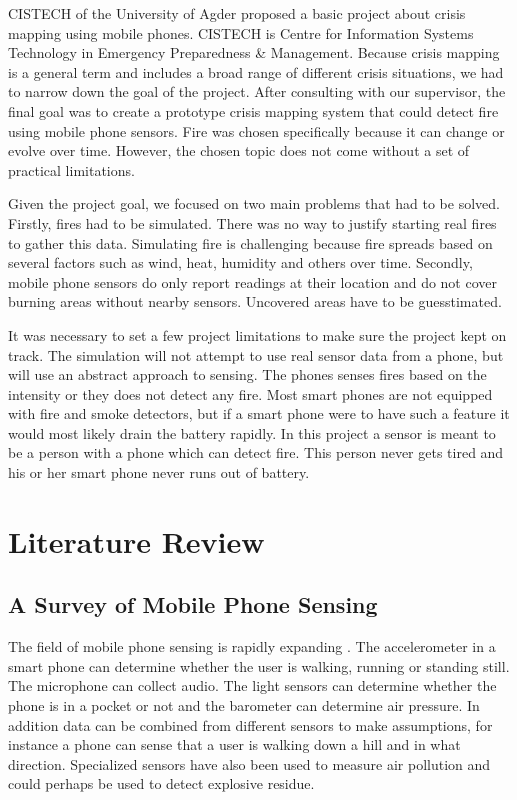 CISTECH of the University of Agder proposed a basic project about crisis mapping using mobile phones. CISTECH is  Centre for Information Systems Technology in Emergency Preparedness \& Management. Because crisis mapping is a general term and includes a broad range of different crisis situations, we had to narrow down the goal of the project. After consulting with our supervisor, the final goal was to create a prototype crisis mapping system that could detect fire using mobile phone sensors. Fire was chosen specifically because it can change or evolve over time. However, the chosen topic does not come without a set of practical limitations.

Given the project goal, we focused on two main problems that had to be solved. Firstly, fires had to be simulated. There was no way to justify starting real fires to gather this data. Simulating fire is challenging because fire spreads based on several factors such as wind, heat, humidity and others over time. Secondly, mobile phone sensors do only report readings at their location and do not cover burning areas without nearby sensors. Uncovered areas have to be guesstimated.

It was necessary to set a few project limitations to make sure the project kept on track. The simulation will not attempt to use real sensor data from a phone, but will use an abstract approach to sensing. The phones senses fires based on the intensity or they does not detect any fire. Most smart phones are not equipped with fire and smoke detectors, but if a smart phone were to have such a feature it would most likely drain the battery rapidly. In this project a sensor is meant to be a person with a phone which can detect fire. This person never gets tired and his or her smart phone never runs out of battery.

\section{Literature Review}

\subsection{A Survey of Mobile Phone Sensing}

The field of mobile phone sensing is rapidly expanding \cite{mobsurv}. The accelerometer in a smart phone can determine whether the user is walking, running or standing still. The microphone can collect audio. The light sensors can determine whether the phone is in a pocket or not and the barometer can determine air pressure. In addition data can be combined from different sensors to make assumptions, for instance a phone can sense that a user is walking down a hill and in what direction. Specialized sensors have also been used to measure air pollution and could perhaps be used to detect explosive residue.

